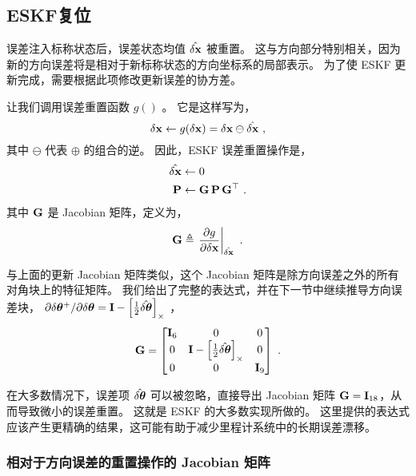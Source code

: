 {%
\subsection{ESKF复位}

误差注入标称状态后，误差状态均值 $\hat{\delta{\bf x}}$ 被重置。 
这与方向部分特别相关，因为新的方向误差将是相对于新标称状态的方向坐标系的局部表示。 
为了使 ESKF 更新完成，需要根据此项修改更新误差的协方差。

\bigskip

让我们调用误差重置函数 $g()$ 。 
它是这样写为，
%
\begin{equation}
\delta{\bf x} \gets g(\delta{\bf x}) = \delta{\bf x} \ominus \hat{\delta{\bf x}}~, \label{equ:resetFcn}
\end{equation}
%
其中 $\ominus$ 代表 $\oplus$ 的组合的逆。
因此，ESKF 误差重置操作是，
%
\begin{align}
\hat{\delta{\bf x}} &\gets 0 \\
{\bf P} &\gets {\bf G}\,{\bf P}\,{\bf G}^{\top}~.
\end{align}
%
其中 ${\bf G}$ 是 Jacobian 矩阵，定义为，
%
\begin{equation}
{\bf G} \triangleq \left.\frac{\partial g}{\partial\delta{\bf x}}\right|_{\hat{\delta{\bf x}}}~.
\end{equation}

与上面的更新 Jacobian 矩阵类似，这个 Jacobian 矩阵是除方向误差之外的所有对角块上的特征矩阵。 
我们给出了完整的表达式，并在下一节中继续推导方向误差块， $\partial\delta{\bm \theta}^+/\partial\delta{\bm \theta} = {\bf I} - \left[\frac12\hat{\delta{\bm \theta}}\right]_\times$ ，
%
\begin{equation}
{\bf G} = \begin{bmatrix}
{\bf I}_6 & 0 & 0 \\
0 & {\bf I} - \left[\frac12\hat{\delta{\bm \theta}}\right]_\times & 0 \\
0 & 0 & {\bf I}_9
\end{bmatrix}~.
\end{equation}

在大多数情况下，误差项 $\hat{\delta{\bm \theta}}$ 可以被忽略，直接导出 Jacobian 矩阵 ${\bf G}={\bf I}_{18}$，从而导致微小的误差重置。 
这就是 ESKF 的大多数实现所做的。
这里提供的表达式应该产生更精确的结果，这可能有助于减少里程计系统中的长期误差漂移。


\subsubsection{相对于方向误差的重置操作的 Jacobian 矩阵}

}
